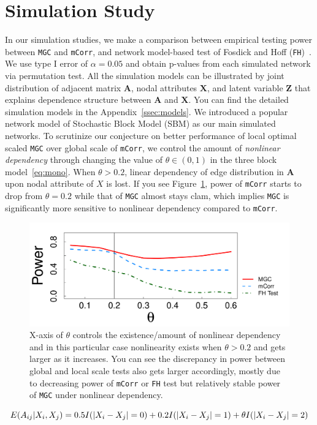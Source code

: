 \documentclass[11pt]{article}
\theoremstyle{definition}
\begin{document}
\section{Simulation Study}
\label{sec:simulation}
	\vspace*{-0.2cm}
In our simulation studies, we make a comparison between empirical testing power between \texttt{MGC} and \texttt{mCorr}, and network model-based test of Fosdick and Hoff (\texttt{FH})~\citep{fosdick2015testing}. We use type I error of $\alpha = 0.05$ and obtain p-values from each simulated network via permutation test. All the simulation models can be illustrated by joint distribution of adjacent matrix $\mathbf{A}$, nodal attributes $\mathbf{X}$, and latent variable $\mathbf{Z}$ that explains dependence structure between $\mathbf{A}$ and $\mathbf{X}$. You can find the detailed simulation models in the Appendix~\ref{ssec:models}. We introduced a popular network model of Stochastic Block Model (SBM) as our main simulated networks. To scrutinize our conjecture on better performance of local optimal scaled \texttt{MGC} over global scale of \texttt{mCorr}, we control the amount of \textit{nonlinear dependency} through changing the value of $\theta \in (0, 1)$ in the three block model~\ref{eq:mono}. When $\theta > 0.2$, linear dependency of edge distribution in $\mathbf{A}$ upon nodal attribute of $X$ is lost. If you see Figure~\ref{fig:powerplot}, power of \texttt{mCorr} starts to drop from $\theta = 0.2$ while that of \texttt{MGC} almost stays clam, which implies \texttt{MGC} is significantly more sensitive to nonlinear dependency compared to \texttt{mCorr}.  
\begin{figure}[h]
	\centering
	\includegraphics[width=0.7\linewidth]{../Figure/mono_simple.pdf}
	\caption{X-axis of $\theta$ controls the existence/amount of nonlinear dependency and in this particular case nonlinearity exists when $\theta > 0.2$ and gets larger as it increases. You can see the discrepancy in power between global and local scale tests also gets larger accordingly, mostly due to decreasing power of \texttt{mCorr} or \texttt{FH} test but relatively stable power of \texttt{MGC} under nonlinear dependency.}
	\label{fig:powerplot}
\end{figure}
	\vspace*{-0.4cm}
\begin{equation}
E(A_{ij} | X_{i}, X_{j}) = 0.5 I(|X_{i} - X_{j}| = 0) + 0.2 I(|X_{i} - X_{j}| = 1) + \theta I(|X_{i} - X_{j}| = 2)
\label{eq:mono}
	\vspace*{-0.4cm}
\end{equation}
\end{document}
